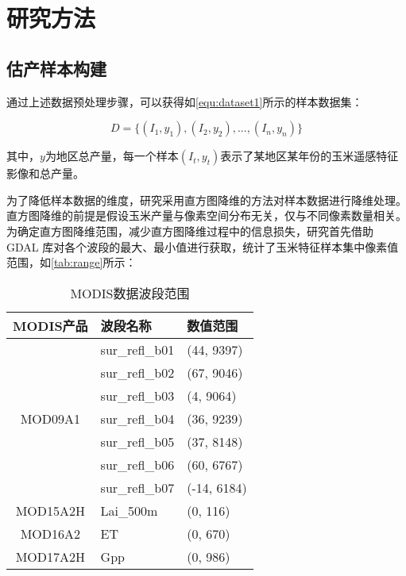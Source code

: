 \section{研究方法}
\subsection{估产样本构建}

\par 通过上述数据预处理步骤，可以获得如\autoref{equ:dataset1}所示的样本数据集：

\begin{equation}
  \label{equ:dataset1}
  D=\{(I_1, y_1),(I_2, y_2), ..., (I_n, y_n)\}
\end{equation}

\par 其中，$y$为地区总产量，每一个样本$(I_t, y_t)$表示了某地区某年份的玉米遥感特征影像和总产量。

\par 为了降低样本数据的维度，研究采用直方图降维的方法对样本数据进行降维处理。直方图降维的前提是假设玉米产量与像素空间分布无关，仅与不同像素数量相关。为确定直方图降维范围，减少直方图降维过程中的信息损失，研究首先借助 GDAL 库对各个波段的最大、最小值进行获取，统计了玉米特征样本集中像素值范围，如\autoref{tab:range}所示：

\begin{table}
  \centering
  \caption{MODIS数据波段范围}
  \label{tab:range}
  \begin{tabularx}{\linewidth}{cX<{\centering}X<{\centering}}
    \toprule
    MODIS产品 & 波段名称 & 数值范围 \\
    \midrule
    & sur\_refl\_b01 & (44, 9397) \\
    & sur\_refl\_b02 & (67, 9046) \\
    & sur\_refl\_b03 & (4, 9064) \\
    MOD09A1 & sur\_refl\_b04 & (36, 9239) \\
    & sur\_refl\_b05 & (37, 8148) \\
    & sur\_refl\_b06 & (60, 6767) \\
    & sur\_refl\_b07 & (-14, 6184) \\ \hline
    MOD15A2H  & Lai\_500m & (0, 116) \\ \hline
    MOD16A2   & ET & (0, 670) \\ \hline
    MOD17A2H  & Gpp & (0, 986) \\
    \bottomrule
\end{tabularx}
\end{table}

